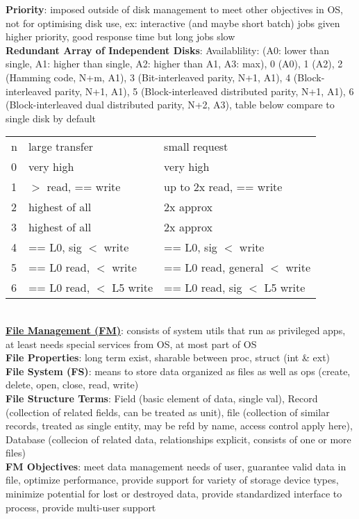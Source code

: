\documentclass[a4paper]{article}
\begin{document}
\begin{multicols}{2}
        \textbf{Priority}: imposed outside of disk management to meet other objectives in OS, not for optimising disk use, ex: interactive (and maybe short batch) jobs given higher priority, good response time but long jobs slow\\
        \textbf{Redundant Array of Independent Disks}: Availablility: (A0: lower than single, A1: higher than single, A2: higher than A1, A3: max), 0 (A0), 1 (A2), 2 (Hamming code, N+m, A1), 3 (Bit-interleaved parity, N+1, A1), 4 (Block-interleaved parity, N+1, A1), 5 (Block-interleaved distributed parity, N+1, A1), 6 (Block-interleaved dual distributed parity, N+2, A3), table below compare to single disk by default\\
        \begin{tabular}{l l l}
            n & large transfer & small request\\
            0 & very high & very high\\
            1 & $>$ read, == write & up to 2x read, == write\\
            2 & highest of all & 2x approx\\
            3 & highest of all & 2x approx\\
            4 & == L0, sig $<$ write & == L0, sig $<$ write\\
            5 & == L0 read, $<$ write & == L0 read, general $<$ write\\
            6 & == L0 read, $<$ L5 write & == L0 read, sig $<$ L5 write\\
        \end{tabular}\\
        \underline{\textbf{File Management (FM)}}: consists of system utils that run as privileged apps, at least needs special services from OS, at most part of OS\\
        \textbf{File Properties}: long term exist, sharable between proc, struct (int \& ext)\\
        \textbf{File System (FS)}: means to store data organized as files as well as ops (create, delete, open, close, read, write)\\
        \textbf{File Structure Terms}: Field (basic element of data, single val), Record (collection of related fields, can be treated as unit), file (collection of similar records, treated as single entity, may be refd by name, access control apply here), Database (collecion of related data, relationships explicit, consists of one or more files)\\
        \textbf{FM Objectives}: meet data management needs of user, guarantee valid data in file, optimize performance, provide support for variety of storage device types, minimize potential for lost or destroyed data, provide standardized interface to process, provide multi-user support\\

\end{multicols}
\end{document}

